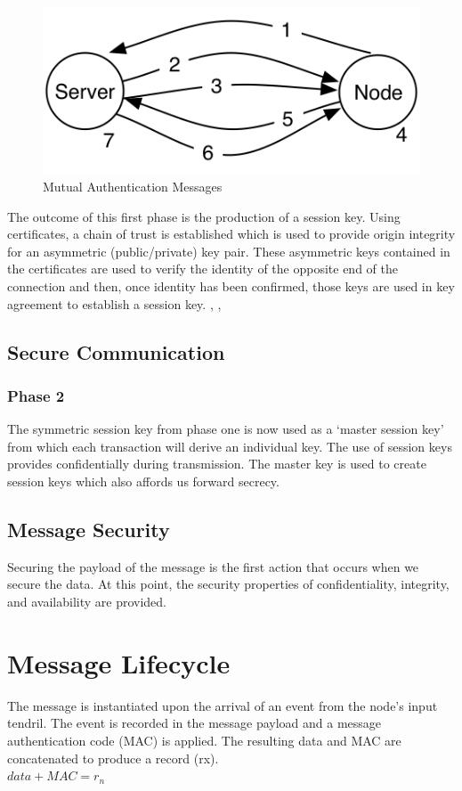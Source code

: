 \begin{figure}
    \centering
    \includegraphics[scale=1, angle=0]{Figures/mutualAuthenticationMessages}
    \caption[Mutual Authentication Messages]{Mutual Authentication Messages}
    \label{fig:mutualAuthenticationMessages}
\end{figure}

The outcome of this first phase is the production of a session key. Using certificates, a chain of trust is established which is used to provide origin integrity for an asymmetric (public/private) key pair. These asymmetric keys contained in the certificates are used to verify the identity of the opposite end of the connection and then, once identity has been confirmed, those keys are used in key agreement to establish a session key. \cite{Rescorla:2000tv}, \cite{Viega:2002wt}, \cite{Oppliger:2014wm}
\subsection{Secure Communication}
\subsubsection{Phase 2}
The symmetric session key from phase one is now used as a ‘master session key’ from which each transaction will derive an individual key. The use of session keys provides confidentially during transmission. The master key is used to create session keys which also affords us forward secrecy.  
\subsection{Message Security}
Securing the payload of the message is the first action that occurs when we secure the data.  
At this point, the security properties of confidentiality, integrity, and availability are provided.
\section{Message Lifecycle}
The message is instantiated upon the arrival of an event from the node’s input tendril.  The event is recorded in the message payload and a message authentication code (MAC) is applied. The resulting data and MAC are concatenated to produce a record (rx).  \\
$data + MAC = r{_n}$
 
